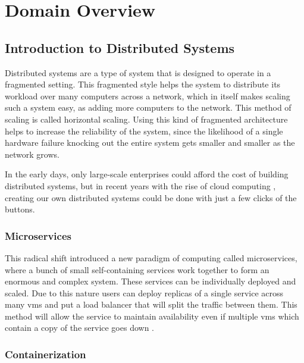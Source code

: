 \section{Domain Overview}

\subsection{Introduction to Distributed Systems}

Distributed systems are a type of system that is designed to operate in a fragmented setting. This fragmented style helps the system to distribute its workload over many computers across a network, which in itself makes scaling such a system easy, as adding more computers to the network. This method of scaling is called horizontal scaling. Using this kind of fragmented architecture helps to increase the reliability of the system, since the likelihood of a single hardware failure knocking out the entire system gets smaller and smaller as the network grows.

In the early days, only large-scale enterprises could afford the cost of building distributed systems, but in recent years with the rise of cloud computing \citep{CloudAdo16:online}, creating our own distributed systems could be done with just a few clicks of the buttons.

\subsubsection{Microservices} \label{sec:intro-microservices}

This radical shift introduced a new paradigm of computing called microservices, where a bunch of small self-containing services work together to form an enormous and complex system. These services can be individually deployed and scaled. Due to this nature users can deploy replicas of a single service across many \acp{vm} and put a load balancer that will split the traffic between them. This method will allow the service to maintain availability even if multiple \acp{vm} which contain a copy of the service goes down \citep{chaczko2011availability}.

\subsubsection{Containerization}

